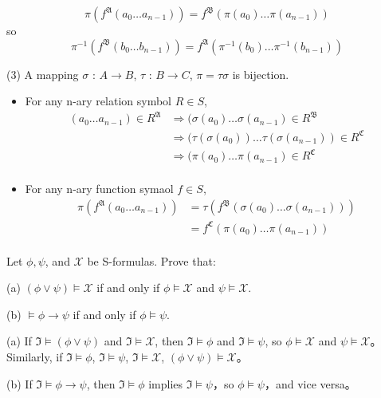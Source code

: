 \documentclass{ximera}
\begin{document}
\begin{problem}
\begin{solution}
\begin{itemize}
            $$\pi (f^{\mathfrak{A}}(a_0 \dots a_{n-1})) = f^{\mathfrak{B}}(\pi(a_0) \dots \pi(a_{n-1})) $$
            so
            $$\pi^{-1} (f^{\mathfrak{B}}(b_0 \dots b_{n-1})) = f^{\mathfrak{A}}(\pi^{-1}(b_0) \dots \pi^{-1}(b_{n-1})) $$
            \end{itemize}

            (3) A mapping $\sigma$ : $A \rightarrow B$, $\tau$ : $B \rightarrow C$, $\pi=\tau\sigma$ is bijection.
            \begin{itemize}
                \item  For any n-ary relation symbol $R \in S$,
                $$
                \begin{aligned}
                    (a_0 \dots a_{n-1}) \in R^{\mathfrak{A}} &\Rightarrow (\sigma(a_0) \dots \sigma(a_{n-1})\in R^{\mathfrak{B}}\\
                                                            &\Rightarrow (\tau(\sigma(a_0)) \dots \tau(\sigma(a_{n-1}))\in R^{\mathfrak{C}}\\
                                                            &\Rightarrow (\pi(a_0) \dots \pi(a_{n-1})\in R^{\mathfrak{C}}\\
                \end{aligned}
                $$
                \item For any n-ary function symaol $f \in S$,
                $$
                \begin{aligned}
                    \pi (f^{\mathfrak{A}}(a_0 \dots a_{n-1})) &= \tau(f^{\mathfrak{B}}(\sigma(a_0) \dots \sigma(a_{n-1}))) \\
                        &= f^{\mathfrak{C}}(\pi(a_0) \dots \pi(a_{n-1})) \\
                \end{aligned}
                $$
            \end{itemize}
        \end{solution}
\end{problem}

\begin{problem} Let $\phi, \psi$, and $\mathcal{X}$ be S-formulas. Prove that:

    (a) $(\phi \lor \psi)  \models \mathcal{X}$ if and only if $\phi \models \mathcal{X}$ and $\psi \models \mathcal{X}$.

    (b) $\models \phi \rightarrow \psi$ if and only if $\phi \models \psi$.
    \begin{solution}
        (a) If $\mathfrak{I} \models (\phi \lor \psi)$ and $\mathfrak{I} \models \mathcal{X}$, 
         then $\mathfrak{I} \models \phi$ and $\mathfrak{I} \models \psi$, so $\phi \models \mathcal{X}$ and $\psi \models \mathcal{X}$。
        Similarly, if $\mathfrak{I} \models \phi$, $\mathfrak{I} \models \psi$, $\mathfrak{I} \models \mathcal{X}$, $(\phi \lor \psi) \models \mathcal{X}$。

        (b) If $\mathfrak{I} \models \phi \rightarrow \psi$, then $\mathfrak{I} \models \phi$ implies $\mathfrak{I} \models \psi$，so $\phi \models \psi$，and vice versa。
    \end{solution}
\end{problem}
\end{document}
